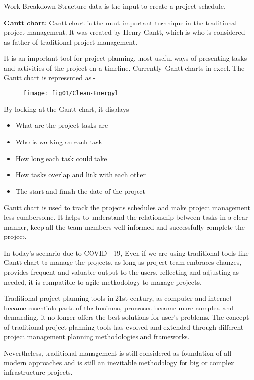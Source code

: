 Work Breakdown Structure data is the input to create a project schedule.

\textbf{Gantt chart:} Gantt chart is the most important technique in the traditional project management. It was created by Henry Gantt, which is who is considered as father of traditional project management.

It is an important tool for project planning, most useful ways of presenting tasks and activities of the project on a timeline. Currently, Gantt charts in excel. The Gantt chart is represented as -
 
\begin{figure}
\centering
  \texttt{[image: fig01/Clean-Energy]}
\end{figure}
 
 
By looking at the Gantt chart, it displays - 

\begin{itemize}
    \item What are the project tasks are 
    \item Who is working on each task 
    \item How long each task could take 
    \item How tasks overlap and link with each other 
    \item The start and finish the date of the project
\end{itemize}

Gantt chart is used to track the projects schedules and make project management less cumbersome. It helps to understand the relationship between tasks in a clear manner, keep all the team members well informed and successfully complete the project.

In today's scenario due to COVID - 19, Even if we are using traditional tools like Gantt chart to manage the projects, as long as project team embraces changes, provides frequent and valuable output to the users, reflecting and adjusting as needed, it is compatible to agile methodology to manage projects. 

Traditional project planning tools in 21st century, as computer and internet became essentials parts of the business, processes became more complex and demanding, it no longer offers the best solutions for user's problems. The concept of traditional project planning tools has evolved and extended through different project management planning methodologies and frameworks.

Nevertheless, traditional management is still considered as foundation of all modern approaches and is still an inevitable methodology for big or complex infrastructure projects.
\\

